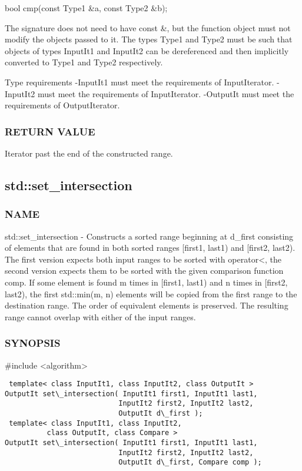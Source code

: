  bool cmp(const Type1 \&a, const Type2 \&b);

The signature does not need to have const \&, but the function object must not modify the objects passed to it.
The types Type1 and Type2 must be such that objects of types InputIt1 and InputIt2 can be dereferenced and then implicitly converted to Type1 and Type2 respectively.

 Type requirements
 -InputIt1 must meet the requirements of InputIterator.
 -InputIt2 must meet the requirements of InputIterator.
 -OutputIt must meet the requirements of OutputIterator.

\subsubsection{RETURN VALUE}
Iterator past the end of the constructed range.



\subsection{std::set\_intersection}

\subsubsection{NAME}
std::set\_intersection - Constructs a sorted range beginning at d\_first consisting of elements that are found in both sorted ranges [first1, last1) and [first2, last2). The first version expects both input ranges to be sorted with operator<, the second version expects them to be sorted with the given comparison function comp. If some element is found m times in [first1, last1) and n times in [first2, last2), the first std::min(m, n) elements will be copied from the first range to the destination range. The order of equivalent elements is preserved. The resulting range cannot overlap with either of the input ranges.

\subsubsection{SYNOPSIS}
\#include <algorithm>

\begin{lstlisting}
 template< class InputIt1, class InputIt2, class OutputIt >
OutputIt set\_intersection( InputIt1 first1, InputIt1 last1,
                           InputIt2 first2, InputIt2 last2,
                           OutputIt d\_first );
 template< class InputIt1, class InputIt2,
          class OutputIt, class Compare >
OutputIt set\_intersection( InputIt1 first1, InputIt1 last1,
                           InputIt2 first2, InputIt2 last2,
                           OutputIt d\_first, Compare comp );
\end{lstlisting}

